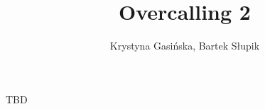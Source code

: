 \documentclass[12pt, a4paper]{article}
\title{Overcalling 2\ntx}
\author{Krystyna Gasińska, Bartek Słupik}
\begin{document}
\maketitle


TBD

\end{document}
